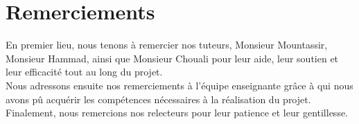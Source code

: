 \chapter*{Remerciements}

En premier lieu, nous tenons {\`a} remercier nos tuteurs, Monsieur Mountassir, Monsieur Hammad, ainsi que Monsieur Chouali pour leur aide, leur soutien et leur efficacit{\'e} tout au long du projet.\\

Nous adressons ensuite nos remerciements {\`a} l'{\'e}quipe enseignante gr{\^a}ce {\`a} qui nous avons p{\^u} acqu{\'e}rir les comp{\'e}tences n{\'e}cessaires {\`a} la r{\'e}alisation du projet.\\

Finalement, nous remercions nos relecteurs pour leur patience et leur gentillesse.


\clearpage
